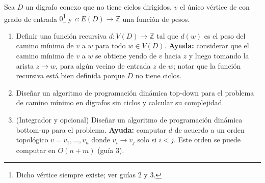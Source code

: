 
 \item Sea $D$ un digrafo conexo que no tiene ciclos dirigidos, $v$ el único vértice de con grado de entrada $0$\footnote{Dicho vértice siempre existe; ver guías $2$ y $3$.} y $c\colon E(D) \to \mathbb{Z}$ una función de pesos.
 \begin{enumerate}[label=$\alph*$.,ref=$\alph*$]
  \item Definir una función recursiva $d\colon V(D) \to \mathbb{Z}$ tal que $d(w)$ es el peso del camino mínimo de $v$ a $w$ para todo $w \in V(D)$.  \textbf{Ayuda:} considerar que el camino mínimo de $v$ a $w$ se obtiene yendo de $v$ hacia $z$ y luego tomando la arista $z \to w$, para algún vecino de entrada $z$ de $w$; notar que la función recursiva está bien definida porque $D$ no tiene ciclos.
  \item Diseñar un algoritmo de programación dinámica top-down para el problema de camino mínimo en digrafos sin ciclos y calcular su complejidad.
  \item (Integrador y opcional) Diseñar un algoritmo de programación dinámica bottom-up para el problema.  \textbf{Ayuda:} computar $d$ de acuerdo a un orden topológico $v = v_1, \ldots, v_n$ donde $v_i \to v_j$ solo si $i < j$.  Este orden se puede computar en $O(n+m)$ (guía 3).
 \end{enumerate}


